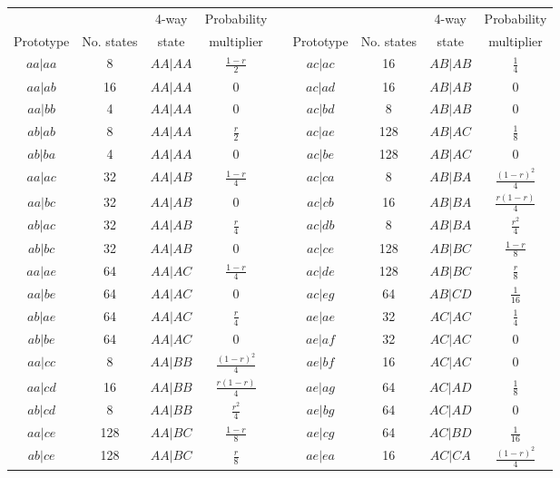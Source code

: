 \documentclass[9pt,letterpaper,twoside]{article}
\begin{document}
{
\begin{center}\begin{tabular}{ccccccccc}\cline{1-4} \cline{6-9}
          &            & 4-way & Probability & &
          &            & 4-way & Probability \\[-6pt] 
Prototype & No. states & state & multiplier & \hspace{10mm} &
Prototype & No. states & state & multiplier \\ \cline{1-4} \cline{6-9}
$aa|aa$ & 8 & $AA|AA$ & $\frac{1-r}{2}$ &&
$ac|ac$ & 16 & $AB|AB$ & $\frac{1}{4}$ \\ 
$aa|ab$ & 16 & $AA|AA$ & $0$ &&
$ac|ad$ & 16 & $AB|AB$ & $0$ \\ 
$aa|bb$ & 4 & $AA|AA$ & $0$ &&
$ac|bd$ & 8 & $AB|AB$ & $0$ \\ 
$ab|ab$ & 8 & $AA|AA$ & $\frac{r}{2}$ &&
$ac|ae$ & 128 & $AB|AC$ & $\frac{1}{8}$ \\ 
$ab|ba$ & 4 & $AA|AA$ & $0$ &&
$ac|be$ & 128 & $AB|AC$ & $0$ \\ 
$aa|ac$ & 32 & $AA|AB$ & $\frac{1-r}{4}$ &&
$ac|ca$ & 8 & $AB|BA$ & $\frac{(1-r)^2}{4}$ \\ 
$aa|bc$ & 32 & $AA|AB$ & $0$ &&
$ac|cb$ & 16 & $AB|BA$ & $\frac{r(1-r)}{4}$ \\ 
$ab|ac$ & 32 & $AA|AB$ & $\frac{r}{4}$ &&
$ac|db$ & 8 & $AB|BA$ & $\frac{r^2}{4}$ \\ 
$ab|bc$ & 32 & $AA|AB$ & $0$ &&
$ac|ce$ & 128 & $AB|BC$ & $\frac{1-r}{8}$ \\ 
$aa|ae$ & 64 & $AA|AC$ & $\frac{1-r}{4}$ &&
$ac|de$ & 128 & $AB|BC$ & $\frac{r}{8}$ \\ 
$aa|be$ & 64 & $AA|AC$ & $0$ &&
$ac|eg$ & 64 & $AB|CD$ & $\frac{1}{16}$ \\ 
$ab|ae$ & 64 & $AA|AC$ & $\frac{r}{4}$ &&
$ae|ae$ & 32 & $AC|AC$ & $\frac{1}{4}$ \\ 
$ab|be$ & 64 & $AA|AC$ & $0$ &&
$ae|af$ & 32 & $AC|AC$ & $0$ \\ 
$aa|cc$ & 8 & $AA|BB$ & $\frac{(1-r)^2}{4}$ &&
$ae|bf$ & 16 & $AC|AC$ & $0$ \\ 
$aa|cd$ & 16 & $AA|BB$ & $\frac{r(1-r)}{4}$ &&
$ae|ag$ & 64 & $AC|AD$ & $\frac{1}{8}$ \\ 
$ab|cd$ & 8 & $AA|BB$ & $\frac{r^2}{4}$ &&
$ae|bg$ & 64 & $AC|AD$ & $0$ \\ 
$aa|ce$ & 128 & $AA|BC$ & $\frac{1-r}{8}$ &&
$ae|cg$ & 64 & $AC|BD$ & $\frac{1}{16}$ \\ 
$ab|ce$ & 128 & $AA|BC$ & $\frac{r}{8}$ &&
$ae|ea$ & 16 & $AC|CA$ & $\frac{(1-r)^2}{4}$ \\ 

\end{tabular}
\end{center}}
\end{document}
